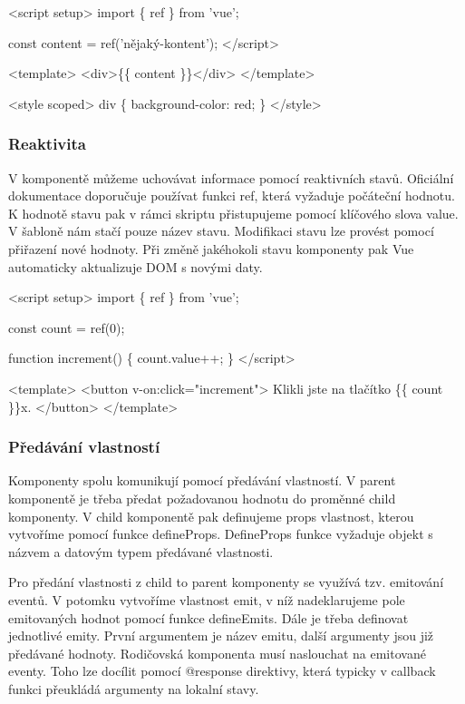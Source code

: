 \begin{prog}
<script setup>
  import \{ ref \} from 'vue';
  
  const content = ref('nějaký-kontent');
</script>
  
<template>
  <div>\{\{ content \}\}</div>
</template>
  
<style scoped>
  div \{
    background-color: red;
  \}
</style>
\end{prog}

\subsubsection{Reaktivita}

V komponentě můžeme uchovávat informace pomocí reaktivních stavů. Oficiální dokumentace doporučuje používat funkci ref, která vyžaduje počáteční hodnotu. 
K hodnotě stavu pak v rámci skriptu přistupujeme pomocí klíčového slova value. V šabloně nám stačí pouze název stavu. 
Modifikaci stavu lze provést pomocí přiřazení nové hodnoty. Při změně jakéhokoli stavu komponenty pak Vue automaticky aktualizuje DOM s novými daty.\cite{vue}

\begin{prog}
<script setup>
  import \{ ref \} from 'vue';
  
  const count = ref(0);

  function increment() \{
    count.value++;
  \}
</script>
  
<template>
  <button v-on:click="increment">
    Klikli jste na tlačítko \{\{ count \}\}x.
  </button>
</template>
\end{prog}

\subsubsection{Předávání vlastností}

Komponenty spolu komunikují pomocí předávání vlastností. V parent komponentě je třeba předat požadovanou hodnotu do proměnné child komponenty. 
V child komponentě pak definujeme props vlastnost, kterou vytvoříme pomocí funkce defineProps. 
DefineProps funkce vyžaduje objekt s názvem a datovým typem předávané vlastnosti.

Pro předání vlastnosti z child to parent komponenty se využívá tzv. emitování eventů. 
V potomku vytvoříme vlastnost emit, v níž nadeklarujeme pole emitovaných hodnot pomocí funkce defineEmits. Dále je třeba definovat jednotlivé emity. 
První argumentem je název emitu, další argumenty jsou již předávané hodnoty. Rodičovská komponenta musí naslouchat na emitované eventy. 
Toho lze docílit pomocí @response direktivy, která typicky v callback funkci přeukládá argumenty na lokalní stavy.\cite{vuemacrae,vue}

